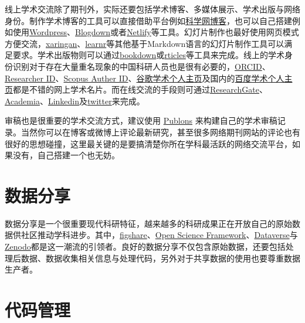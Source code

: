 \documentclass[]{tufte-book}
\begin{document}
线上学术交流除了期刊外，实际还要包括学术博客、多媒体展示、学术出版与网络身份。制作学术博客的工具可以直接借助平台例如\href{http://blog.sciencenet.cn/}{科学网博客}，也可以自己搭建例如使用\href{https://zh-cn.wordpress.com/}{Wordpress}、\href{https://bookdown.org/yihui/blogdown/}{Blogdown}或者\href{https://www.netlify.com/}{Netlify}等工具。幻灯片制作也最好使用网页模式方便交流，\href{https://github.com/yihui/xaringan}{xaringan}、\href{https://rstudio.github.io/learnr/}{learnr}等其他基于Markdown语言的幻灯片制作工具可以满足要求。学术出版物则可以通过\href{https://bookdown.org/}{bookdown}或\href{https://github.com/rstudio/rticles}{rticles}等工具来完成。线上的学术身份识别对于存在大量重名现象的中国科研人员也是很有必要的，\href{https://orcid.org/}{ORCID}、\href{http://www.researcherid.com/}{Researcher ID}、\href{https://www.scopus.com/}{Scopus Auther ID}、\href{https://scholar.google.com}{谷歌学术个人主页}及国内的\href{https://xueshu.baidu.com/}{百度学术个人主页}都是不错的网上学术名片。而在线交流的手段则可通过\href{https://www.researchgate.net/}{ResearchGate}、\href{https://www.academia.edu/}{Academia}、\href{https://www.linkedin.com/}{Linkedin}及\href{https://twitter.com/}{twitter}来完成。

审稿也是很重要的学术交流方式，建议使用 \href{https://publons.com/home/}{Publons} 来构建自己的学术审稿记录。当然你可以在博客或微博上评论最新研究，甚至很多网络期刊网站的评论也有很好的思想碰撞，这里最关键的是要搞清楚你所在学科最活跃的网络交流平台，如果没有，自己搭建一个也无妨。

\hypertarget{ux6570ux636eux5206ux4eab}{%
\section*{数据分享}\label{ux6570ux636eux5206ux4eab}}

数据分享是一个很重要现代科研特征，越来越多的科研成果正在开放自己的原始数据供社区推动学科进步。其中，\href{https://figshare.com/}{figshare}、\href{https://osf.io/}{Open Science Framework}、\href{https://dataverse.org/}{Dataverse}与\href{https://zenodo.org/}{Zenodo}都是这一潮流的引领者。良好的数据分享不仅包含原始数据，还要包括处理后数据、数据收集相关信息与处理代码，另外对于共享数据的使用也要尊重数据生产者。

\hypertarget{ux4ee3ux7801ux7ba1ux7406}{%
\section*{代码管理}\label{ux4ee3ux7801ux7ba1ux7406}}
\end{document}

